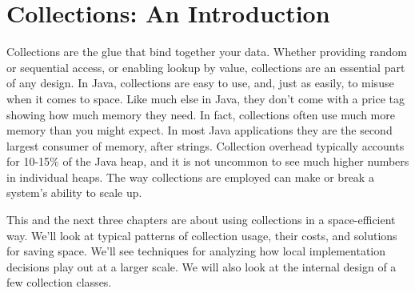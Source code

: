 \chapter{Collections: An Introduction}
\label{chapter:brief-introduction-collections}

Collections are the glue that bind together your data. 
Whether providing random or sequential access, or
enabling lookup by value, collections are an essential part of any design.
In Java, collections are easy to use, and, just as easily, to misuse
when it comes to space. Like much else in Java, they don't come with a price tag
showing how much memory they need. In fact, collections
often use much more memory than you might expect. In most Java applications they are the
second largest consumer of memory, after
strings.  Collection overhead typically accounts
for 10-15\% of the Java heap, and it is not uncommon to see much higher numbers
in individual heaps. The way collections are employed can make or break a system's
ability to scale up.

This and the next three chapters are about using
collections in a space-efficient way. We'll look at typical patterns of
collection usage, their costs, and solutions for saving space. We'll see
techniques for analyzing how local implementation decisions play out at a larger scale.
We will also look at the internal design of a few collection classes.




%

